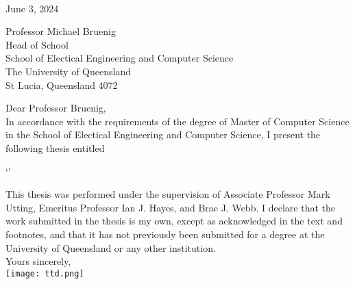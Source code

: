 \begin{flushright}
    \authortext\\
    \href{mailto:\authoremailtext}{\authoremailtext}
\end{flushright}

\vspace{2cm}
\noindent
June 3, 2024 \\\bigskip

\noindent
Professor Michael Bruenig\\
Head of School\\
School of Electical Engineering and Computer Science\\
The University of Queensland\\
St Lucia, Queensland 4072\\\bigskip

\noindent
Dear Professor Bruenig,\\

In accordance with the requirements of the degree of Master of Computer Science in the School of Electical Engineering and Computer Science, I present the following thesis entitled

\begin{center}
`\titletext'
\end{center}

This thesis was performed under the supervision of Associate Professor Mark Utting, Emeritus Professor Ian J. Hayes, and Brae J. Webb. I declare that the work submitted in the thesis is my own, except as acknowledged in the text and footnotes, and that it has not previously been submitted for a degree at the University of Queensland or any other institution.\\

\noindent
Yours sincerely,\\%
\texttt{[image: ttd.png]}\\
\noindent
\authortext

\clearpage